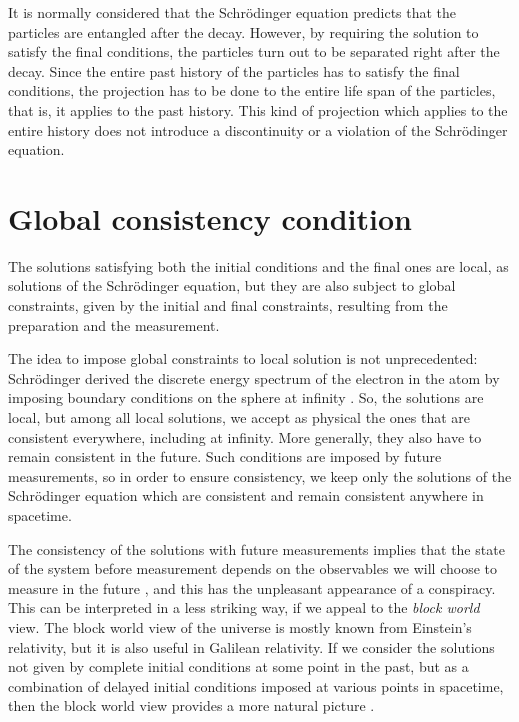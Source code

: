 \documentclass[12pt]{amsart}
\theoremstyle{definition}
\theoremstyle{plain}
\begin{document}
It is normally considered that the Schr\"odinger equation predicts that the particles are entangled after the decay. However, by requiring the solution to satisfy the final conditions, the particles turn out to be separated right after the decay. Since the entire past history of the particles has to satisfy the final conditions, the projection has to be done to the entire life span of the particles, that is, it applies to the past history. This kind of projection which applies to the entire history does not introduce a discontinuity or a violation of the Schr\"odinger equation.


\section{Global consistency condition}
\label{s:global_consistency}

The solutions satisfying both the initial conditions and the final ones are local, as solutions of the Schr\"odinger equation, but they are also subject to global constraints, given by the initial and final constraints, resulting from the preparation and the measurement.

The idea to impose global constraints to local solution is not unprecedented: Schr\"odinger derived the discrete energy spectrum of the electron in the atom by imposing boundary conditions on the sphere at infinity \cite{Sch26}. So, the solutions are local, but among all local solutions, we accept as physical the ones that are consistent everywhere, including at infinity. More generally, they also have to remain consistent in the future. Such conditions are imposed by future measurements, so in order to ensure consistency, we keep only the solutions of the Schr\"odinger equation which are consistent and remain consistent anywhere in spacetime.

The consistency of the solutions with future measurements implies that the state of the system before measurement depends on the observables we will choose to measure in the future \cite{Sto12QMb}, and this has the unpleasant appearance of a conspiracy. This can be interpreted in a less striking way, if we appeal to the \emph{block world} view. The block world view of the universe is mostly known from Einstein's relativity, but it is also useful in Galilean relativity. If we consider the solutions not given by complete initial conditions at some point in the past, but as a combination of delayed initial conditions imposed at various points in spacetime, then the block world view provides a more natural picture \cite{Sto12QMa,Sto12QMc,Sto13bSpringer}.
\end{document}
